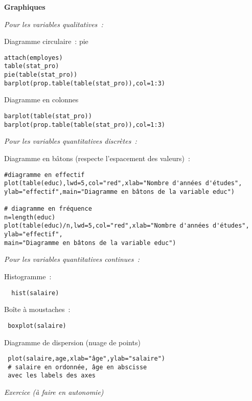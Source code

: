 \documentclass[11pt]{article}
\begin{document}
{\begin{verbatim}
\end{verbatim}
{\bf Graphiques}

{\it Pour les variables qualitatives~:}

Diagramme circulaire~: pie

\begin{verbatim}
attach(employes)
table(stat_pro)
pie(table(stat_pro))
barplot(prop.table(table(stat_pro)),col=1:3)
\end{verbatim}
Diagramme en colonnes

\begin{verbatim}
barplot(table(stat_pro))
barplot(prop.table(table(stat_pro)),col=1:3)
\end{verbatim}

{\it Pour les variables quantitatives discrètes~:}

Diagramme en bâtons (respecte l'espacement des valeurs)~:

\begin{verbatim}
#diagramme en effectif
plot(table(educ),lwd=5,col="red",xlab="Nombre d'années d'études",
ylab="effectif",main="Diagramme en bâtons de la variable educ")

# diagramme en fréquence
n=length(educ)
plot(table(educ)/n,lwd=5,col="red",xlab="Nombre d'années d'études",
ylab="effectif",
main="Diagramme en bâtons de la variable educ")
\end{verbatim}

{\it Pour les variables quantitatives continues~:}

Histogramme~: \begin{verbatim}  hist(salaire)  \end{verbatim}

\bigskip

Boîte à moustaches~: \begin{verbatim} boxplot(salaire)  \end{verbatim}

\bigskip

Diagramme de dispersion (nuage de points)
\begin{verbatim}
 plot(salaire,age,xlab="âge",ylab="salaire")
 # salaire en ordonnée, âge en abscisse
 avec les labels des axes
\end{verbatim}

\medskip

{\it Exercice (à faire en autonomie)}

}
\end{document}
